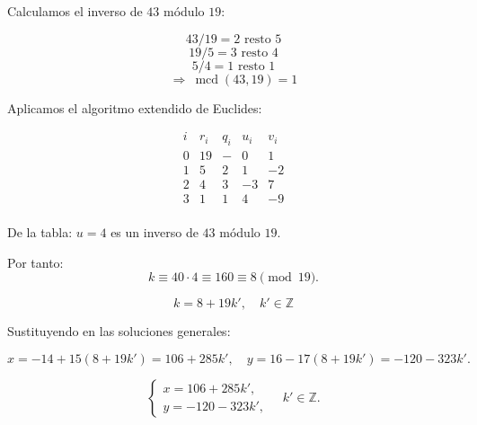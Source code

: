\documentclass[a4paper,12pt]{article}
\begin{document}
\begin{ejercicio}[title=Ejercicio 35]

Calculamos el inverso de $43$ módulo $19$:

\[
43 / 19 = 2 \text{ resto } 5
\]
\[
19 / 5 = 3 \text{ resto } 4
\]
\[
5 / 4 = 1 \text{ resto } \boxed{1}
\]
\[
\Rightarrow \ \operatorname{mcd}(43,19) = \boxed{1}
\]

Aplicamos el algoritmo extendido de Euclides:

\[
\begin{array}{c|c|c|c|c}
i & r_i & q_i & u_i & v_i \\ \hline
0 & 19 & - & 0 & 1 \\
1 & 5 & 2 & 1 & -2 \\
2 & 4 & 3 & -3 & 7 \\
3 & \boxed{1} & 1 & 4 & -9 \\
\end{array}
\]

De la tabla: $u = 4$ es un inverso de $43$ módulo $19$.

\vspace{0.5em}

Por tanto:
\[
k \equiv 40 \cdot 4 \equiv 160 \equiv 8 \pmod{19}.
\]

\[
\boxed{k = 8 + 19k', \quad k' \in \mathbb{Z}}
\]

Sustituyendo en las soluciones generales:

\[
x = -14 + 15(8 + 19k') = 106 + 285k', \quad
y = 16 - 17(8 + 19k') = -120 - 323k'.
\]

\[
\boxed{
\begin{cases}
x = 106 + 285k',\\
y = -120 - 323k',
\end{cases}
\quad k' \in \mathbb{Z}.
}
\]

\end{ejercicio}
\end{document}
